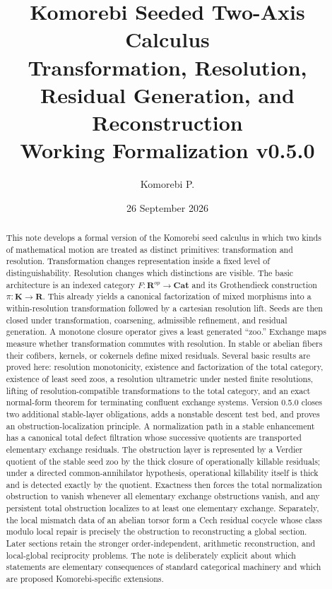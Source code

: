 \documentclass[11pt]{article}
\title{\textbf{Komorebi Seeded Two-Axis Calculus}\\
\large Transformation, Resolution, Residual Generation, and Reconstruction\\[0.4em]
\normalsize Working Formalization v0.5.0}
\author{Komorebi P.}
\date{26 September 2026}
\theoremstyle{definition}
\theoremstyle{remark}
\newcommand{\K}{\mathbf K}
\newcommand{\Rcat}{\mathbf R}
\newcommand{\Cat}{\mathbf{Cat}}
\begin{document}
\maketitle

\begin{abstract}
This note develops a formal version of the Komorebi seed calculus in which two kinds of mathematical motion are treated as distinct primitives: transformation and resolution. Transformation changes representation inside a fixed level of distinguishability. Resolution changes which distinctions are visible. The basic architecture is an indexed category $F:\Rcat^{op}\to\Cat$ and its Grothendieck construction $\pi:\K\to\Rcat$. This already yields a canonical factorization of mixed morphisms into a within-resolution transformation followed by a cartesian resolution lift. Seeds are then closed under transformation, coarsening, admissible refinement, and residual generation. A monotone closure operator gives a least generated ``zoo.'' Exchange maps measure whether transformation commutes with resolution. In stable or abelian fibers their cofibers, kernels, or cokernels define mixed residuals. Several basic results are proved here: resolution monotonicity, existence and factorization of the total category, existence of least seed zoos, a resolution ultrametric under nested finite resolutions, lifting of resolution-compatible transformations to the total category, and an exact normal-form theorem for terminating confluent exchange systems. Version 0.5.0 closes two additional stable-layer obligations, adds a nonstable descent test bed, and proves an obstruction-localization principle. A normalization path in a stable enhancement has a canonical total defect filtration whose successive quotients are transported elementary exchange residuals. The obstruction layer is represented by a Verdier quotient of the stable seed zoo by the thick closure of operationally killable residuals; under a directed common-annihilator hypothesis, operational killability itself is thick and is detected exactly by the quotient. Exactness then forces the total normalization obstruction to vanish whenever all elementary exchange obstructions vanish, and any persistent total obstruction localizes to at least one elementary exchange. Separately, the local mismatch data of an abelian torsor form a Cech residual cocycle whose class modulo local repair is precisely the obstruction to reconstructing a global section. Later sections retain the stronger order-independent, arithmetic reconstruction, and local-global reciprocity problems. The note is deliberately explicit about which statements are elementary consequences of standard categorical machinery and which are proposed Komorebi-specific extensions.
\end{abstract}
\end{document}
